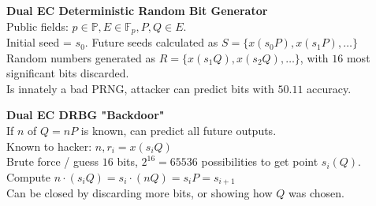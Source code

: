 \documentclass[10pt]{article}
\begin{document}
\begin{multicols}{2}
    \noindent
    \textbf{Dual EC Deterministic Random Bit Generator}\\
    Public fields: $p\in \mathbb{P}, E \in \mathbb{F}_p, P,Q \in E$.\\
    Initial seed = $s_0$. Future seeds calculated as $S = \{x(s_0P), x(s_1P),\dots\}$\\
    Random numbers generated as $R = \{x(s_1Q), x(s_2Q), \dots\}$, with $16$ most significant bits discarded.\\
    Is innately a bad PRNG, attacker can predict bits with $50.11$ accuracy.

    \noindent
    \textbf{Dual EC DRBG "Backdoor"}\\
    If $n$ of $Q = nP$ is known, can predict all future outputs.\\
    Known to hacker: $n, r_i=x(s_iQ)$\\
    Brute force / guess $16$ bits, $2^{16} = 65536$ possibilities to get point $s_i(Q)$.\\
    Compute $n\cdot (s_iQ)=s_i \cdot (nQ) = s_i P = s_{i+1}$\\
    Can be closed by discarding more bits, or showing how $Q$ was chosen.\\


\end{multicols}
\end{document}
